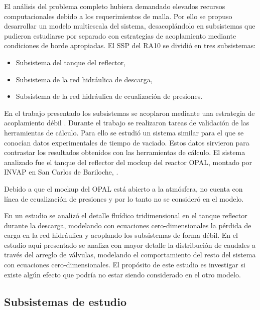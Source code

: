 El análisis del problema completo hubiera demandado elevados recursos computacionales debido a los requerimientos de malla.
Por ello se propuso desarrollar un modelo multiescala del sistema,
desacoplándolo en subsistemas que pudieron estudiarse por separado con estrategias de acoplamiento mediante condiciones de borde apropiadas.
El SSP del RA10 se dividió en tres subsistemas:

\begin{itemize}
\item Subsistema del tanque del reflector,
\item Subsistema de la red hidráulica de descarga,
\item Subsistema de la red hidráulica de ecualización de presiones.
\end{itemize}

En el trabajo presentado los subsistemas se acoplaron mediante una estrategia de acoplamiento débil \cite{ra10-paper} \cite{ra10-enief}.
Durante el trabajo se realizaron tareas de validación de las herramientas de cálculo.
Para ello se estudió un sistema similar para el que se conocían datos experimentales de tiempo de vaciado.
Estos datos sirvieron para contrastar los resultados obtenidos con las herramientas de cálculo.
El sistema analizado fue el tanque del reflector del mockup del reactor OPAL, 
montado por INVAP en San Carlos de Bariloche, \cite{invap-mockup}.

Debido a que el mockup del OPAL está abierto a la atmósfera, no cuenta con línea de ecualización de presiones y por lo tanto no se consideró en el modelo.

En un estudio \cite{cnea-informe-mockup} se analizó el detalle fluídico tridimensional en el tanque reflector durante la descarga,
modelando con ecuaciones cero-dimensionales la pérdida de carga en la red hidráulica 
y acoplando los subsistemas de forma débil.
En el estudio aquí presentado se analiza con mayor detalle la distribución de caudales a través del arreglo de válvulas,
modelando el comportamiento del resto del sistema con ecuaciones cero-dimensionales.
El propósito de este estudio es investigar si existe algún efecto que podría no estar siendo considerado en el otro modelo.

\subsection*{Subsistemas de estudio}


